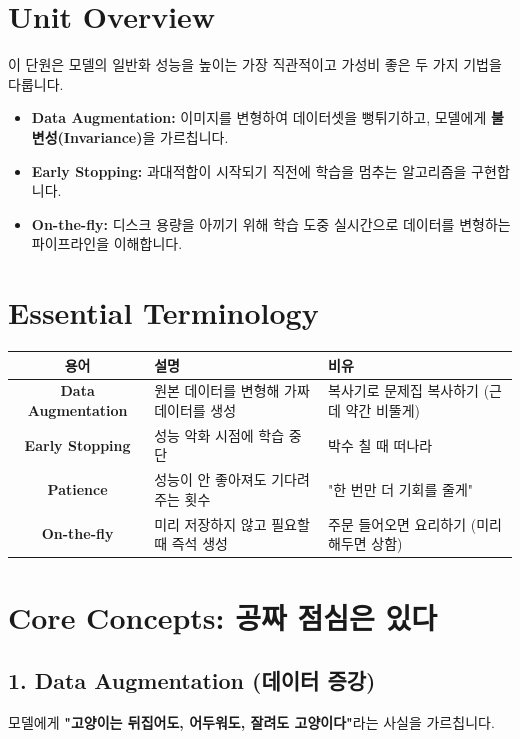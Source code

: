 \documentclass[11pt,a4paper]{book}
\theoremstyle{definition}
\begin{document}
\section{Unit Overview}
\begin{summarybox}[title={핵심 목표}]
이 단원은 모델의 일반화 성능을 높이는 가장 직관적이고 가성비 좋은 두 가지 기법을 다룹니다.
\begin{itemize}
    \item \textbf{Data Augmentation:} 이미지를 변형하여 데이터셋을 뻥튀기하고, 모델에게 \textbf{불변성(Invariance)}을 가르칩니다.
    \item \textbf{Early Stopping:} 과대적합이 시작되기 직전에 학습을 멈추는 알고리즘을 구현합니다.
    \item \textbf{On-the-fly:} 디스크 용량을 아끼기 위해 학습 도중 실시간으로 데이터를 변형하는 파이프라인을 이해합니다.
\end{itemize}
\end{summarybox}

\section{Essential Terminology}
\begin{center}
\begin{tabular}{|c|l|l|}
\hline
\textbf{용어} & \textbf{설명} & \textbf{비유} \\ \hline
\textbf{Data Augmentation} & 원본 데이터를 변형해 가짜 데이터를 생성 & 복사기로 문제집 복사하기 (근데 약간 비뚤게) \\ \hline
\textbf{Early Stopping} & 성능 악화 시점에 학습 중단 & 박수 칠 때 떠나라 \\ \hline
\textbf{Patience} & 성능이 안 좋아져도 기다려주는 횟수 & "한 번만 더 기회를 줄게" \\ \hline
\textbf{On-the-fly} & 미리 저장하지 않고 필요할 때 즉석 생성 & 주문 들어오면 요리하기 (미리 해두면 상함) \\ \hline
\end{tabular}
\end{center}

\section{Core Concepts: 공짜 점심은 있다}

\subsection{1. Data Augmentation (데이터 증강)}
모델에게 \textbf{"고양이는 뒤집어도, 어두워도, 잘려도 고양이다"}라는 사실을 가르칩니다.
\end{document}
